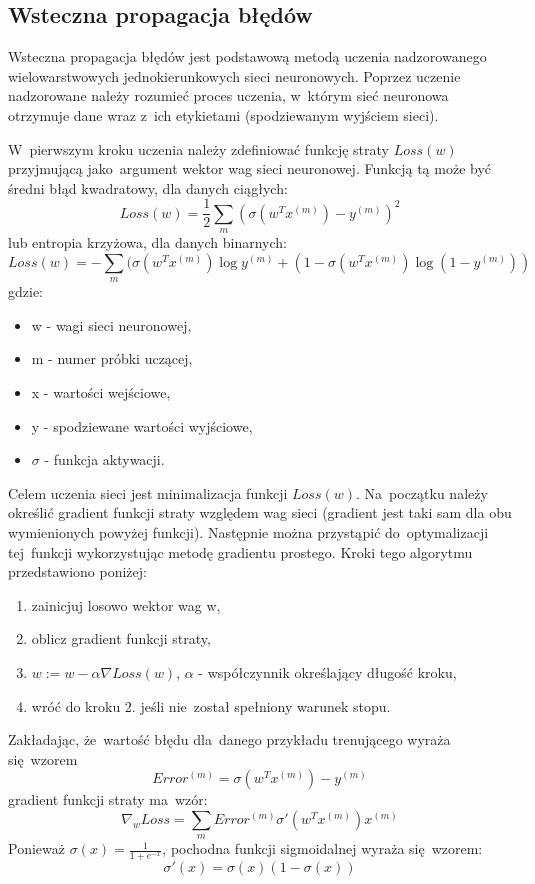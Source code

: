 \subsection{Wsteczna propagacja błędów} \label{ssec:backpropagation}
Wsteczna propagacja błędów jest podstawową metodą uczenia nadzorowanego wielowarstwowych jednokierunkowych
sieci neuronowych. Poprzez uczenie nadzorowane należy rozumieć proces uczenia, w~którym sieć neuronowa
otrzymuje dane wraz z~ich etykietami (spodziewanym wyjściem sieci).

W~pierwszym kroku uczenia należy zdefiniować funkcję straty $Loss(w)$ przyjmującą jako~argument wektor wag
sieci neuronowej. Funkcją tą może być średni błąd kwadratowy, dla danych ciągłych:\\
$$Loss(w)=\frac{1}{2}\sum\limits_{m}(\sigma(w^{T}x^{(m)}) - y^{(m)})^2$$
lub entropia krzyżowa, dla danych binarnych:
$$Loss(w)=-\sum\limits_m(\sigma(w^{T}x^{(m)})\log{y^{(m)}} + (1-\sigma(w^{T}x^{(m)})\log{(1-y^{(m)})})
$$
gdzie:
\begin{itemize}
  \item w - wagi sieci neuronowej,
  \item m - numer próbki uczącej,
  \item x - wartości wejściowe,
  \item y - spodziewane wartości wyjściowe,
  \item $\sigma$ - funkcja aktywacji.
\end{itemize}

Celem uczenia sieci jest minimalizacja funkcji $Loss(w)$. Na~początku należy określić gradient funkcji straty
względem wag sieci (gradient jest taki sam dla obu wymienionych powyżej funkcji).
Następnie można przystąpić do~optymalizacji tej~funkcji wykorzystując metodę gradientu prostego.
Kroki tego algorytmu przedstawiono poniżej:
\begin{enumerate}
  \item zainicjuj losowo wektor wag w,
  \item oblicz gradient funkcji straty,
  \item $w:=w-\alpha \nabla Loss(w)$, $\alpha$ - współczynnik określający długość kroku,
  \item wróć do kroku 2. jeśli nie~został spełniony warunek stopu.
\end{enumerate}

Zakładając, że~wartość błędu dla~danego przykładu trenującego wyraża się~wzorem
$$Error^{(m)}=\sigma(w^{T}x^{(m)})-y^{(m)}$$
gradient funkcji straty ma~wzór:
$$\nabla_{w}Loss=\sum\limits_{m}Error^{(m)}\sigma'(w^{T}x^{(m)})x^{(m)}$$
Ponieważ $\sigma(x)=\frac{1}{1+e^{-x}}$, pochodna funkcji sigmoidalnej wyraża się~wzorem:
$$\sigma'(x)=\sigma(x)(1-\sigma(x))$$

